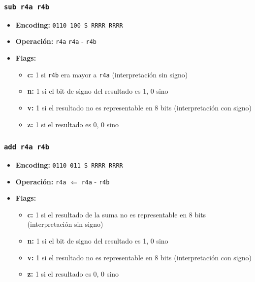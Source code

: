 \documentclass{article}
\begin{document}
\subsubsection{\texttt{sub r4a r4b}}
\begin{itemize}
    \item \textbf{Encoding:} \texttt{0110 100 S RRRR RRRR}
    \item \textbf{Operación:} \texttt{r4a} \Leftarrow \texttt{r4a} - \texttt{r4b}
    \item \textbf{Flags:}
        \begin{itemize}
            \item \textbf{c:} 1 si \texttt{r4b} era mayor a \texttt{r4a} (interpretación sin signo)
            \item \textbf{n:} 1 si el bit de signo del resultado es 1, 0 sino
            \item \textbf{v:} 1 si el resultado no es representable en 8 bits (interpretación con signo)
            \item \textbf{z:} 1 si el resultado es 0, 0 sino
        \end{itemize}
\end{itemize}

\subsubsection{\texttt{add r4a r4b}}
\begin{itemize}
    \item \textbf{Encoding:} \texttt{0110 011 S RRRR RRRR}
    \item \textbf{Operación:} \texttt{r4a} $\Leftarrow$ \texttt{r4a} - \texttt{r4b}
    \item \textbf{Flags:}
        \begin{itemize}
            \item \textbf{c:} 1 si el resultado de la suma no es representable en 8 bits (interpretación sin signo)
            \item \textbf{n:} 1 si el bit de signo del resultado es 1, 0 sino
            \item \textbf{v:} 1 si el resultado no es representable en 8 bits (interpretación con signo)
            \item \textbf{z:} 1 si el resultado es 0, 0 sino
        \end{itemize}
\end{itemize}
  
\end{document}
